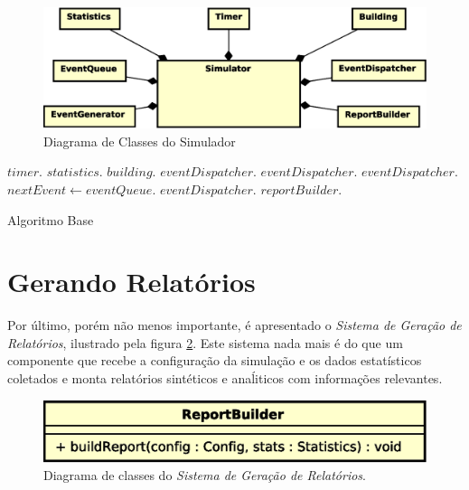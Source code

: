 \begin{figure}[htb!]
  \centering
  \includegraphics[scale=0.6]{img/Simulator.eps}
  \caption{Diagrama de Classes do Simulador}
\label{fig:diagram:simulator}
\end{figure}

\begin{algorithm}[htb]
\begin{center}
\begin{algorithmic}[1]
  \State $timer.$
  \State $statistics.$
  \State $building.$
  \State $eventDispatcher.$
  \State $eventDispatcher.$
  \State $eventDispatcher.$
    \State $nextEvent \leftarrow eventQueue.$
    \State $eventDispatcher.$
  \EndWhile
  \State $reportBuilder.$
\EndFunction
\end{algorithmic}
\end{center}
\caption
   {\label{alg:base}Algoritmo Base}
\end{algorithm}

\section{\label{sec:model:report}Gerando Relatórios}

Por último, porém não menos importante, é apresentado o \textit{Sistema de
Geração de Relatórios}, ilustrado pela figura \ref{fig:diagram:report}. Este
sistema nada mais é do que um componente que recebe a configuração da simulação
e os dados estatísticos coletados e monta relatórios sintéticos e anaĺiticos com
informações relevantes.

\begin{figure}[htb!]
  \centering
  \includegraphics[scale=0.6]{img/Report.eps}
  \caption{Diagrama de classes do \textit{Sistema de Geração de Relatórios}.}
\label{fig:diagram:report}
\end{figure}


